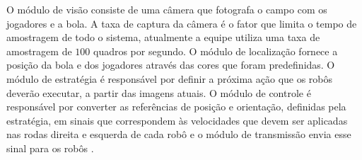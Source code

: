 O módulo de visão consiste de uma câmera que fotografa o campo com os jogadores e a bola. A taxa de captura da câmera é o fator que limita o tempo de amostragem de todo o sistema, atualmente a equipe utiliza uma taxa de amostragem de $100$ quadros por segundo. O módulo de localização fornece a posição da bola e dos jogadores através das cores que foram predefinidas. O módulo de estratégia é responsável por definir a próxima ação que os robôs deverão executar, a partir das imagens atuais. O módulo de controle é responsável por converter as referências de posição e orientação, definidas pela estratégia, em sinais que correspondem às velocidades que devem ser aplicadas nas rodas direita e esquerda de cada robô e o módulo de transmissão envia esse sinal para os robôs \cite{POTI}.\\




